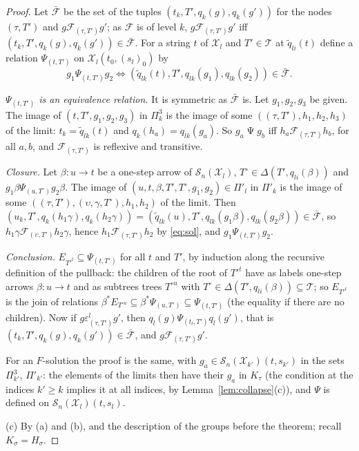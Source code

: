 \documentclass[11pt]{amsart}
\theoremstyle{definition}
\newcommand{\cX}{\mathcal X}
\newcommand{\cS}{\mathcal S}
\begin{document}
\begin{proof}
Let $\bar{\mathcal F}$ be the set of the tuples $(t_k,T',q_k(g),
q_k(g'))$ for the nodes $(\tau,T')$ and $g\mathrel{\mathcal F_{(\tau,
T')}}g'$; as $\mathcal F$ is of level $k$, $g\mathrel{\mathcal
F_{(\tau,T')}}g'$ iff $(t_k,T',q_k(g),q_k(g'))\in\bar{\mathcal F}$.
For a string $t$ of $\cX_l$ and $T'\in\mathcal T$ at $\tilde q_{li}
(t)$ define a relation $\Psi_{(t,T')}$ on $\cX_l(t_0,(s_l)_0)$ by
\[
g_1\mathrel{\Psi_{(t,T')}}g_2\iff(\tilde q_{lk}(t),T',q_{lk}(g_1),
q_{lk}(g_2))\in\bar{\mathcal F}.
\]

\emph{$\Psi_{(t,T')}$ is an equivalence relation.} It is symmetric
as $\bar{\mathcal F}$ is. Let $g_1,g_2,g_3$ be given. The image of
$(t,T',g_1,g_2,g_3)$ in $\Pi^3_k$ is the image of some
$((\tau,T'),h_1,h_2,h_3)$ of the limit: $t_k=\tilde q_{lk}(t)$ and
$q_k(h_a)=q_{lk}(g_a)$. So $g_a\mathrel\Psi g_b$ iff
$h_a\mathrel{\mathcal F_{(\tau,T')}}h_b$, for all $a,b$, and
$\mathcal F_{(\tau,T')}$ is reflexive and transitive.

\emph{Closure.} Let $\beta\colon u\to t$ be a one-step arrow of
$\cS_n(\cX_l)$, $T^\circ\in\Delta(T',q_{li}(\beta))$ and
$g_1\beta\mathrel{\Psi_{(u,T^\circ)}}g_2\beta$. The image of
$(u,t,\beta,T',T^\circ,g_1,g_2)\in\Pi'_l$ in $\Pi'_k$ is the
image of some $((\tau,T'),(\upsilon,\gamma,T^\circ),h_1,h_2)$ of the
limit. Then $(u_k,T^\circ,q_k(h_1\gamma),q_k(h_2\gamma))=(\tilde
q_{lk}(u),T^\circ,q_{lk}(g_1\beta),q_{lk}(g_2\beta))\in
\bar{\mathcal F}$, so $h_1\gamma\mathrel{\mathcal F_{(\upsilon,
T^\circ)}}h_2\gamma$, hence $h_1\mathrel{\mathcal F_{(\tau,T')}}h_2$
by \eqref{eq:sol}, and $g_1\mathrel{\Psi_{(t,T')}}g_2$.

\emph{Conclusion.} $E_{T'^t}\subseteq\Psi_{(t,T')}$ for all $t$ and
$T'$, by induction along the recursive definition of the pullback:
the children of the root of $T'^t$ have as labels one-step arrows
$\beta\colon u\to t$ and as subtrees trees $T^{\circ u}$ with
$T^\circ\in\Delta(T',q_{li}(\beta))\subseteq\mathcal T$; so
$E_{T'^t}$ is the join of relations $\beta^*E_{T^{\circ u}}\subseteq
\beta^*\Psi_{(u,T^\circ)}\subseteq\Psi_{(t,T')}$ (the equality if
there are no children). Now if $g\mathrel{\varepsilon^l_{(\tau,T')}}
g'$, then $q_l(g)\mathrel{\Psi_{(t_l,T')}}q_l(g')$, that is
$(t_k,T',q_k(g),q_k(g'))\in\bar{\mathcal F}$, and $g\mathrel{\mathcal
F_{(\tau,T')}}g'$.

For an $F$-solution the proof is the same, with $g_a\in\cS_n(\cX_{k'})
(t,s_{k'})$ in the sets $\Pi^3_{k'}$, $\Pi'_{k'}$: the elements of
the limits then have their $g_a$ in $K_\tau$ (the condition at the
indices $k'\ge k$ implies it at all indices, by
Lemma~\ref{lem:collapse}(c)), and $\Psi$ is defined on
$\cS_n(\cX_l)(t,s_l)$.

(c) By (a) and (b), and the description of the groups before the
theorem; recall $K_\sigma=H_\sigma$.
\end{proof}
\end{document}
